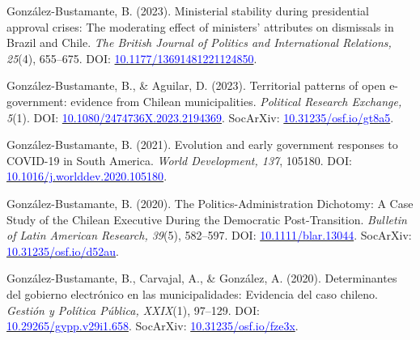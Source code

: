 \begin{publications}
\begin{benumerate}{14}
\item{González-Bustamante, B. (2023). Ministerial stability during presidential approval crises: The moderating effect of ministers' attributes on dismissals in Brazil and Chile. {\itshape The British Journal of Politics and International Relations, 25}(4), 655--675. DOI: \href{https://doi.org/10.1177/13691481221124850}{\textcolor{blue}{10.1177/13691481221124850}}.}\vspace{1mm}

\item{González-Bustamante, B., \& Aguilar, D. (2023). Territorial patterns of open e-government: evidence from Chilean municipalities. {\itshape Political Research Exchange, 5}(1). DOI: \href{https://doi.org/10.1080/2474736X.2023.2194369}{\textcolor{blue}{10.1080/2474736X.2023.2194369}}. SocArXiv: \href{https://doi.org/10.31235/osf.io/gt8a5}{\textcolor{blue}{10.31235/osf.io/gt8a5}}.}\vspace{1mm}

\item{González-Bustamante, B. (2021). Evolution and early government responses to COVID-19 in South America. {\itshape World Development, 137}, 105180. DOI: \href{https://doi.org/10.1016/j.worlddev.2020.105180}{\textcolor{blue}{10.1016/j.worlddev.2020.105180}}.}\vspace{1mm}


\item{González-Bustamante, B. (2020). The Politics-Administration Dichotomy: A Case Study of the Chilean Executive During the Democratic Post-Transition. {\itshape Bulletin of Latin American Research, 39}(5), 582--597. DOI: \href{https://doi.org/10.1111/blar.13044}{\textcolor{blue}{10.1111/blar.13044}}. SocArXiv: \href{https://doi.org/10.31235/osf.io/d52au}{\textcolor{blue}{10.31235/osf.io/d52au}}.}\vspace{1mm}

\item{González-Bustamante, B., Carvajal, A., \& González, A. (2020). Determinantes del gobierno electrónico en las municipalidades: Evidencia del caso chileno. {\itshape Gestión y Política Pública, XXIX}(1), 97--129. DOI: \\ \href{http://dx.doi.org/10.29265/gypp.v29i1.658}{\textcolor{blue}{10.29265/gypp.v29i1.658}}. SocArXiv: \href{https://doi.org/10.31235/osf.io/fze3x}{\textcolor{blue}{10.31235/osf.io/fze3x}}.} \vspace{1mm}


\end{benumerate}
\end{publications}

